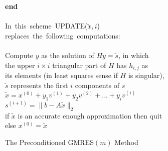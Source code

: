 \begin{figure}[tp]
\begin{center}
{{\begin{tabbing}
          {\bf end} \\
          \mbox{~}\\
          \mbox{In this scheme UPDATE($\tilde{x},i$)} \\
          \mbox{replaces the following computations:} \\
          \mbox{~} \\
          Compute $y$ as the solution of $Hy=\tilde{s}$, in which  \\
          the upper $i \times i$ triangular part of $H$ has $h_{i,j}$ as \\
          its elements (in least squares sense if $H$ is singular), \\
          $\tilde{s}$ represents the first $i$ components of $s$  \\
          $\tilde{x}=x^{(0)}+y_1 v^{(1)}+y_2 v^{(2)}+ . . . +y_i v^{(i)}$ \\
          $s^{(i+1)} = \|b-A\tilde{x}\|_2$ \\
          if $\tilde{x}$ is an accurate enough approximation then quit  \\
          else $x^{(0)}=\tilde{x}$
        \end{tabbing}
        }}
    \caption{The Preconditioned GMRES$(m)$ Method}
    \label{fig:pgmres}
  \end{center}
\end{figure}

